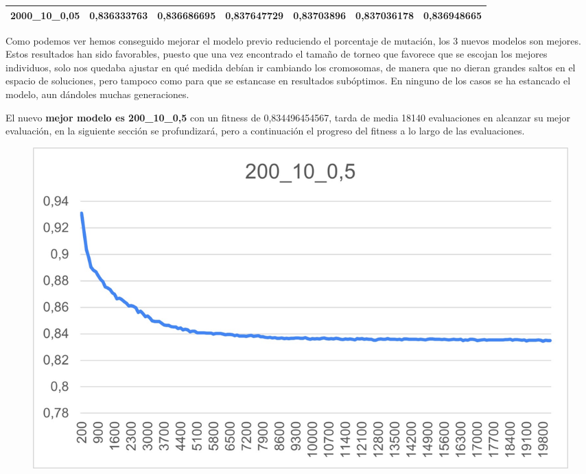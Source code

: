 \documentclass[12pt, spanish, pdftex]{UC3M_document}
\begin{document}
\begin{table}[H]
{\begin{tabular}{|l|l|l|l|l|l|l|}
			2000\_10\_0,05                                                                       & \cellcolor[HTML]{63BE7B}0,836333763                                            & \cellcolor[HTML]{B1D47F}0,836686695                                            & \cellcolor[HTML]{F8696B}0,837647729                                            & \cellcolor[HTML]{FFEB84}0,83703896                                             & \cellcolor[HTML]{FFEB84}0,837036178                                            & \cellcolor[HTML]{FDC67D}0,836948665                                                \\ \hline
		\end{tabular}%
	}
\end{table}

Como podemos ver hemos conseguido mejorar el modelo previo reduciendo el porcentaje de mutación, los 3 nuevos modelos son mejores. Estos resultados han sido favorables, puesto que una vez encontrado el tamaño de torneo que favorece que se escojan los mejores individuos, solo nos quedaba ajustar en qué medida debían ir cambiando los cromosomas, de manera que no dieran grandes saltos en el espacio de soluciones, pero tampoco como para que se estancase en resultados subóptimos. En ninguno de los casos se ha estancado el modelo, aun dándoles muchas generaciones.

El nuevo \textbf{mejor modelo es 200\_10\_0,5} con un fitness de 0,834496454567, tarda de media 18140 evaluaciones en alcanzar su mejor evaluación, en la siguiente sección se profundizará, pero a continuación el progreso del fitness a lo largo de las evaluaciones.

\begin{figure}[H]
	{\includegraphics[scale=.8]{./img/200_10_0,5.jpg}}
\end{figure}
\end{document}
